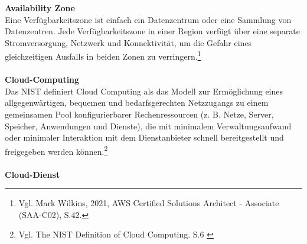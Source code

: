 \textbf{Availability Zone}\\
Eine Verfügbarkeitszone ist einfach ein Datenzentrum oder eine Sammlung von Datenzentren. Jede Verfügbarkeitszone in einer Region verfügt über eine separate Stromversorgung, Netzwerk und Konnektivität, um die Gefahr eines gleichzeitigen Ausfalls in beiden Zonen zu verringern.\footnote{Vgl. Mark Wilkins, 2021, AWS Certified Solutions Architect - Associate (SAA-C02), S.42.\cite{AWS1}}
\\\\
\textbf{Cloud-Computing}\\
Das NIST definiert Cloud Computing als das Modell zur Ermöglichung eines allgegenwärtigen, bequemen und bedarfsgerechten Netzzugangs zu einem gemeinsamen Pool konfigurierbarer Rechenressourcen (z. B. Netze, Server, Speicher, Anwendungen und Dienste), die mit minimalem Verwaltungsaufwand oder minimaler Interaktion mit dem Dienstanbieter schnell bereitgestellt und freigegeben werden können.\footnote{Vgl. The NIST Definition of Cloud Computing. S.6 \cite{CC1}}
\\\\
\textbf{Cloud-Dienst}\\
